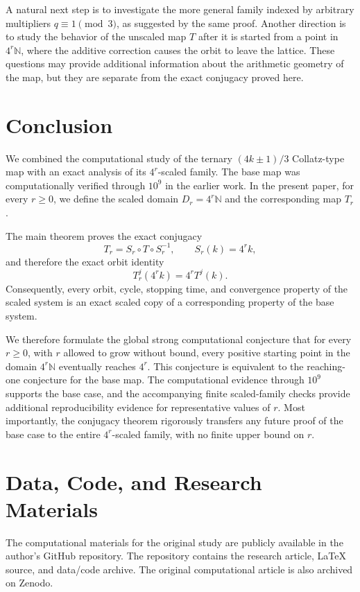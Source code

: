 \documentclass[11pt]{article}
\newcommand{\N}{\mathbb{N}}
\begin{document}
A natural next step is to investigate the more general family indexed by arbitrary multipliers $q\equiv1\pmod3$, as suggested by the same proof. Another direction is to study the behavior of the unscaled map $T$ after it is started from a point in $4^r\N$, where the additive correction causes the orbit to leave the lattice. These questions may provide additional information about the arithmetic geometry of the map, but they are separate from the exact conjugacy proved here.

\section{Conclusion}
We combined the computational study of the ternary $(4k\pm1)/3$ Collatz-type map with an exact analysis of its $4^r$-scaled family. The base map was computationally verified through $10^9$ in the earlier work. In the present paper, for every $r\ge0$, we define the scaled domain $D_r=4^r\N$ and the corresponding map $T_r$.

The main theorem proves the exact conjugacy
\[
T_r=S_r\circ T\circ S_r^{-1},
\qquad S_r(k)=4^rk,
\]
and therefore the exact orbit identity
\[
T_r^j(4^rk)=4^rT^j(k).
\]
Consequently, every orbit, cycle, stopping time, and convergence property of the scaled system is an exact scaled copy of a corresponding property of the base system.

We therefore formulate the global strong computational conjecture that for every $r\ge0$, with $r$ allowed to grow without bound, every positive starting point in the domain $4^r\N$ eventually reaches $4^r$. This conjecture is equivalent to the reaching-one conjecture for the base map. The computational evidence through $10^9$ supports the base case, and the accompanying finite scaled-family checks provide additional reproducibility evidence for representative values of $r$. Most importantly, the conjugacy theorem rigorously transfers any future proof of the base case to the entire $4^r$-scaled family, with no finite upper bound on $r$.

\section*{Data, Code, and Research Materials}
The computational materials for the original study are publicly available in the author's GitHub repository. The repository contains the research article, LaTeX source, and data/code archive. The original computational article is also archived on Zenodo.
\end{document}
